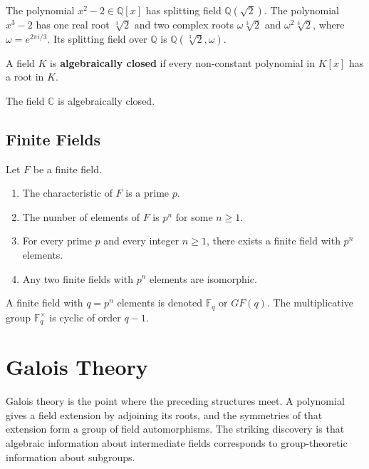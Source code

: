 \begin{example}
The polynomial $x^2-2\in\mathbb{Q}[x]$ has splitting field $\mathbb{Q}(\sqrt{2})$. The polynomial $x^3-2$ has one real root $\sqrt[3]{2}$ and two complex roots $\omega\sqrt[3]{2}$ and $\omega^2\sqrt[3]{2}$, where $\omega=e^{2\pi i/3}$. Its splitting field over $\mathbb{Q}$ is $\mathbb{Q}(\sqrt[3]{2},\omega)$.
\end{example}

\begin{definition}
A field $K$ is \textbf{algebraically closed} if every non-constant polynomial in $K[x]$ has a root in $K$.
\end{definition}

\begin{theorem}
The field $\mathbb{C}$ is algebraically closed.
\end{theorem}

\subsection{Finite Fields}

\begin{theorem}
Let $F$ be a finite field.
\begin{enumerate}
    \item The characteristic of $F$ is a prime $p$.
    \item The number of elements of $F$ is $p^n$ for some $n\geq 1$.
    \item For every prime $p$ and every integer $n\geq 1$, there exists a finite field with $p^n$ elements.
    \item Any two finite fields with $p^n$ elements are isomorphic.
\end{enumerate}
\end{theorem}

\begin{remark}
A finite field with $q=p^n$ elements is denoted $\mathbb{F}_q$ or $GF(q)$. The multiplicative group $\mathbb{F}_q^\times$ is cyclic of order $q-1$.
\end{remark}

\section{Galois Theory}


Galois theory is the point where the preceding structures meet. A polynomial gives a field extension by adjoining its roots, and the symmetries of that extension form a group of field automorphisms. The striking discovery is that algebraic information about intermediate fields corresponds to group-theoretic information about subgroups.

